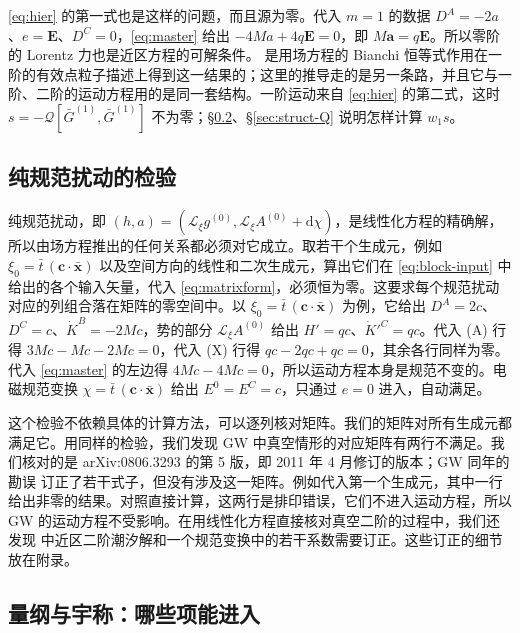 \documentclass[11pt,a4paper]{ctexart}
\newcommand{\dd}{\mathrm d}
\begin{document}
\eqref{eq:hier} 的第一式也是这样的问题，而且源为零。代入 $m=1$ 的数据 $D^A=-2a$、$e=\boldsymbol E$、$D^C=0$，\eqref{eq:master} 给出 $-4Ma+4q\boldsymbol E=0$，即 $M\boldsymbol a=q\boldsymbol E$。所以零阶的 Lorentz 力也是近区方程的可解条件。\citet{Gralla2010} 是用场方程的 Bianchi 恒等式作用在一阶的有效点粒子描述上得到这一结果的；这里的推导走的是另一条路，并且它与一阶、二阶的运动方程用的是同一套结构。一阶运动来自 \eqref{eq:hier} 的第二式，这时 $s=-\mathcal Q[\bar G^{(1)},\bar G^{(1)}]$ 不为零；\S\ref{sec:struct-dim}、\S\ref{sec:struct-Q} 说明怎样计算 $w_1s$。

\subsection{纯规范扰动的检验}\label{sec:struct-gauge}

纯规范扰动，即 $(h,a)=(\mathcal L_\xi g^{(0)},\mathcal L_\xi A^{(0)}+\dd\chi)$，是线性化方程的精确解，所以由场方程推出的任何关系都必须对它成立。取若干个生成元，例如 $\xi_0=\bar t\,(\boldsymbol c\cdot\bar{\boldsymbol x})$ 以及空间方向的线性和二次生成元，算出它们在 \eqref{eq:block-input} 中给出的各个输入矢量，代入 \eqref{eq:matrixform}，必须恒为零。这要求每个规范扰动对应的列组合落在矩阵的零空间中。以 $\xi_0=\bar t\,(\boldsymbol c\cdot\bar{\boldsymbol x})$ 为例，它给出 $D^A=2c$、$D^C=c$、$\dot K^B=-2Mc$，势的部分 $\mathcal L_\xi A^{(0)}$ 给出 $H'=qc$、$\dot K'^C=qc$。代入 (A) 行得 $3Mc-Mc-2Mc=0$，代入 (X) 行得 $qc-2qc+qc=0$，其余各行同样为零。代入 \eqref{eq:master} 的左边得 $4Mc-4Mc=0$，所以运动方程本身是规范不变的。电磁规范变换 $\chi=\bar t\,(\boldsymbol c\cdot\bar{\boldsymbol x})$ 给出 $E^0=E^C=c$，只通过 $e=0$ 进入，自动满足。

这个检验不依赖具体的计算方法，可以逐列核对矩阵。我们的矩阵对所有生成元都满足它。用同样的检验，我们发现 GW 中真空情形的对应矩阵有两行不满足。我们核对的是 arXiv:0806.3293 的第 5 版，即 2011 年 4 月修订的版本；GW 同年的勘误 \citep{GrallaWald2011erratum} 订正了若干式子，但没有涉及这一矩阵。例如代入第一个生成元，其中一行给出非零的结果。对照直接计算，这两行是排印错误，它们不进入运动方程，所以 GW 的运动方程不受影响。在用线性化方程直接核对真空二阶的过程中，我们还发现 \citet{Gralla2012} 中近区二阶潮汐解和一个规范变换中的若干系数需要订正。这些订正的细节放在附录。

\subsection{量纲与宇称：哪些项能进入}\label{sec:struct-dim}
\end{document}
